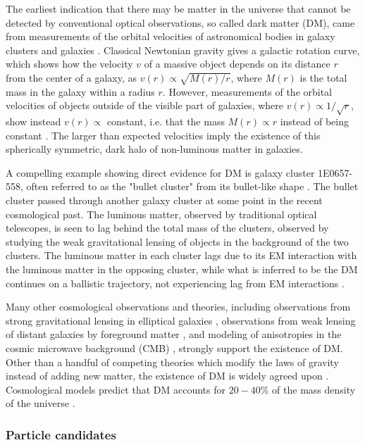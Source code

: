 The earliest indication that there may be matter in the universe that cannot be detected by conventional optical observations, so called dark matter (DM), came from measurements of the orbital velocities of astronomical bodies in galaxy clusters \cite{Kapteyn:1922zz, Zwicky:1937zza} and galaxies \cite{Rubin:1970zza, Rubin:1980zd}. Classical Newtonian gravity gives a galactic rotation curve, which shows how the velocity $v$ of a massive object depends on its distance $r$ from the center of a galaxy, as $v(r) \propto \sqrt{M(r)/r}$, where $M(r)$ is the total mass in the galaxy within a radius $r$. However, measurements of the orbital velocities of objects outside of the visible part of galaxies, where $v(r) \propto 1/\sqrt{r}$, show instead $v(r) \propto$ constant, i.e. that the mass $M(r) \propto r$ instead of being constant \cite{Agashe:2014kda}. The larger than expected velocities imply the existence of this spherically symmetric, dark halo of non-luminous matter in galaxies. 

\indent A compelling example showing direct evidence for DM is galaxy cluster 1E0657-558, often referred to as the "bullet cluster" from its bullet-like shape \cite{Clowe:2003tk}. The bullet cluster passed through another galaxy cluster at some point in the recent cosmological past. The luminous matter, observed by traditional optical telescopes, is seen to lag behind the total mass of the clusters, observed by studying the weak gravitational lensing of objects in the background of the two clusters. The luminous matter in each cluster lags due to its EM interaction with the luminous matter in the opposing cluster, while what is inferred to be the DM continues on a ballistic trajectory, not experiencing lag from EM interactions \cite{Agashe:2014kda}. 

Many other cosmological observations and theories, including observations from strong gravitational lensing in elliptical galaxies \cite{Koopmans:2002qh}, observations from weak lensing of distant galaxies by foreground matter \cite{Hoekstra:2002nf}, and modeling of anisotropies in the cosmic microwave background (CMB) \cite{Hu:2001bc, Hu:1996qs}, strongly support the existence of DM. Other than a handful of competing theories which modify the laws of gravity instead of adding new matter, the existence of DM is widely agreed upon \cite{Bertone:2004pz}. Cosmological models predict that DM accounts for $20-40$\% of the mass density of the universe \cite{Bergstrom:2000pn}.

\subsubsection{Particle candidates}

